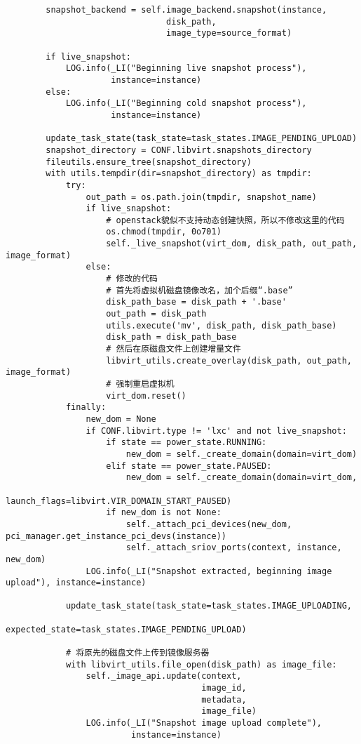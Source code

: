 \documentclass[a4paper,left=1.5cm,right=1.5cm,11pt]{article}
\begin{document}
\begin{lstlisting}
        snapshot_backend = self.image_backend.snapshot(instance,
                                disk_path,
                                image_type=source_format)

        if live_snapshot:
            LOG.info(_LI("Beginning live snapshot process"),
                     instance=instance)
        else:
            LOG.info(_LI("Beginning cold snapshot process"),
                     instance=instance)

        update_task_state(task_state=task_states.IMAGE_PENDING_UPLOAD)
        snapshot_directory = CONF.libvirt.snapshots_directory
        fileutils.ensure_tree(snapshot_directory)
        with utils.tempdir(dir=snapshot_directory) as tmpdir:
            try:
                out_path = os.path.join(tmpdir, snapshot_name)
                if live_snapshot:
                    # openstack貌似不支持动态创建快照，所以不修改这里的代码
                    os.chmod(tmpdir, 0o701)
                    self._live_snapshot(virt_dom, disk_path, out_path, image_format)
                else:
                    # 修改的代码
                    # 首先将虚拟机磁盘镜像改名，加个后缀“.base”
                    disk_path_base = disk_path + '.base'
                    out_path = disk_path
                    utils.execute('mv', disk_path, disk_path_base)
                    disk_path = disk_path_base
                    # 然后在原磁盘文件上创建增量文件
                    libvirt_utils.create_overlay(disk_path, out_path, image_format)
                    # 强制重启虚拟机
                    virt_dom.reset()
            finally:
                new_dom = None
                if CONF.libvirt.type != 'lxc' and not live_snapshot:
                    if state == power_state.RUNNING:
                        new_dom = self._create_domain(domain=virt_dom)
                    elif state == power_state.PAUSED:
                        new_dom = self._create_domain(domain=virt_dom,
                                launch_flags=libvirt.VIR_DOMAIN_START_PAUSED)
                    if new_dom is not None:
                        self._attach_pci_devices(new_dom, pci_manager.get_instance_pci_devs(instance))
                        self._attach_sriov_ports(context, instance, new_dom)
                LOG.info(_LI("Snapshot extracted, beginning image upload"), instance=instance)
            
            update_task_state(task_state=task_states.IMAGE_UPLOADING, 
                              expected_state=task_states.IMAGE_PENDING_UPLOAD)
            
            # 将原先的磁盘文件上传到镜像服务器
            with libvirt_utils.file_open(disk_path) as image_file:
                self._image_api.update(context,
                                       image_id,
                                       metadata,
                                       image_file)
                LOG.info(_LI("Snapshot image upload complete"),
                         instance=instance) 
    \end{lstlisting}
\end{document}
